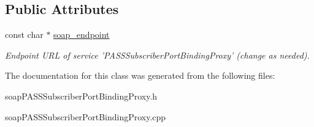 \subsection*{Public Attributes}
\begin{DoxyCompactItemize}
\item 
\hypertarget{classPASSSubscriberPortBindingProxy_a7851a06fa2ad3a89a92f353fb0e2ccc7}{
const char $\ast$ \hyperlink{classPASSSubscriberPortBindingProxy_a7851a06fa2ad3a89a92f353fb0e2ccc7}{soap\_\-endpoint}}
\label{classPASSSubscriberPortBindingProxy_a7851a06fa2ad3a89a92f353fb0e2ccc7}

\begin{DoxyCompactList}\small\item\em Endpoint URL of service 'PASSSubscriberPortBindingProxy' (change as needed). \item\end{DoxyCompactList}\end{DoxyCompactItemize}


The documentation for this class was generated from the following files:\begin{DoxyCompactItemize}
\item 
soapPASSSubscriberPortBindingProxy.h\item 
soapPASSSubscriberPortBindingProxy.cpp\end{DoxyCompactItemize}
